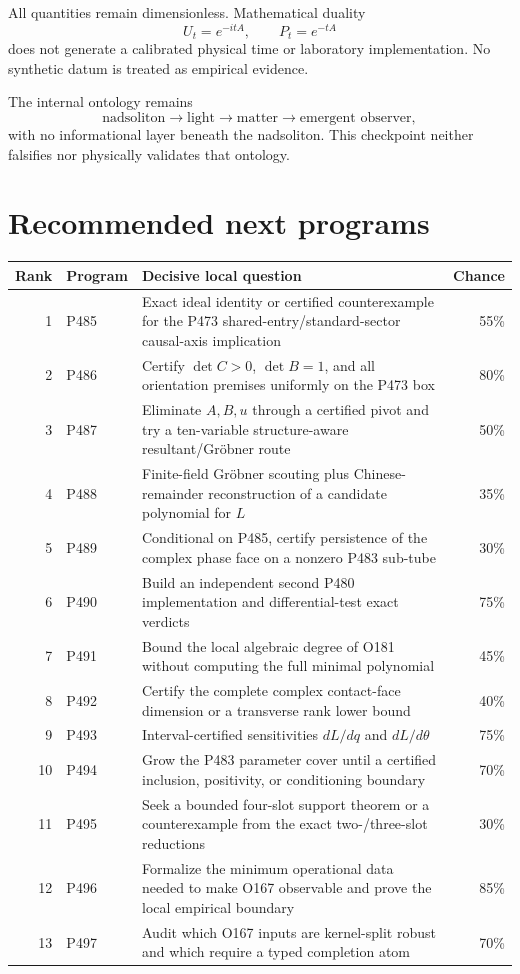 \documentclass[11pt,a4paper,openany]{report}
\begin{document}
All quantities remain dimensionless. Mathematical duality
\[
 U_t=e^{-itA},\qquad P_t=e^{-tA}
\]
does not generate a calibrated physical time or laboratory implementation.
No synthetic datum is treated as empirical evidence.

The internal ontology remains
\[
 \text{nadsoliton}\longrightarrow\text{light}\longrightarrow
 \text{matter}\longrightarrow\text{emergent observer},
\]
with no informational layer beneath the nadsoliton. This checkpoint neither
falsifies nor physically validates that ontology.

\chapter{Recommended next programs}

\begin{center}\scriptsize
\begin{longtable}{@{}r p{}p{}r@{}}
\toprule
\textbf{Rank}&\textbf{Program}&\textbf{Decisive local question}&\textbf{Chance}\\ \midrule\endhead
1&P485&Exact ideal identity or certified counterexample for the P473 shared-entry/standard-sector causal-axis implication&55\%\\
2&P486&Certify \(\det C>0\), \(\det B=1\), and all orientation premises uniformly on the P473 box&80\%\\
3&P487&Eliminate \(A,B,u\) through a certified pivot and try a ten-variable structure-aware resultant/Gr\"obner route&50\%\\
4&P488&Finite-field Gr\"obner scouting plus Chinese-remainder reconstruction of a candidate polynomial for \(L\)&35\%\\
5&P489&Conditional on P485, certify persistence of the complex phase face on a nonzero P483 sub-tube&30\%\\
6&P490&Build an independent second P480 implementation and differential-test exact verdicts&75\%\\
7&P491&Bound the local algebraic degree of O181 without computing the full minimal polynomial&45\%\\
8&P492&Certify the complete complex contact-face dimension or a transverse rank lower bound&40\%\\
9&P493&Interval-certified sensitivities \(dL/dq\) and \(dL/d\theta\)&75\%\\
10&P494&Grow the P483 parameter cover until a certified inclusion, positivity, or conditioning boundary&70\%\\
11&P495&Seek a bounded four-slot support theorem or a counterexample from the exact two-/three-slot reductions&30\%\\
12&P496&Formalize the minimum operational data needed to make O167 observable and prove the local empirical boundary&85\%\\
13&P497&Audit which O167 inputs are kernel-split robust and which require a typed completion atom&70\%\\
\bottomrule
\end{longtable}
\end{center}
\end{document}
